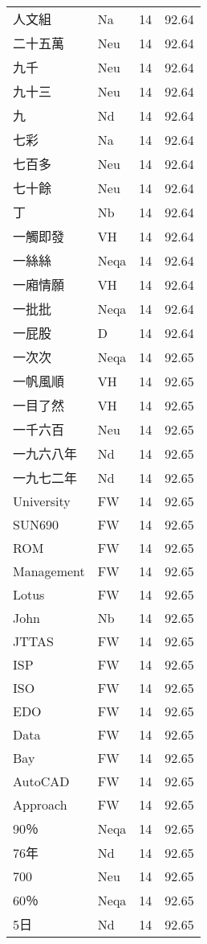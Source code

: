 \documentclass[twocolumn]{book}
\begin{document}
\begin{supertabular}{llrr}
人文組 & Na & 14 &  92.64\\
二十五萬 & Neu & 14 &  92.64\\
九千 & Neu & 14 &  92.64\\
九十三 & Neu & 14 &  92.64\\
九 & Nd & 14 &  92.64\\
七彩 & Na & 14 &  92.64\\
七百多 & Neu & 14 &  92.64\\
七十餘 & Neu & 14 &  92.64\\
丁 & Nb & 14 &  92.64\\
一觸即發 & VH & 14 &  92.64\\
一絲絲 & Neqa & 14 &  92.64\\
一廂情願 & VH & 14 &  92.64\\
一批批 & Neqa & 14 &  92.64\\
一屁股 & D & 14 &  92.64\\
一次次 & Neqa & 14 &  92.65\\
一帆風順 & VH & 14 &  92.65\\
一目了然 & VH & 14 &  92.65\\
一千六百 & Neu & 14 &  92.65\\
一九六八年 & Nd & 14 &  92.65\\
一九七二年 & Nd & 14 &  92.65\\
University & FW & 14 &  92.65\\
SUN690 & FW & 14 &  92.65\\
ROM & FW & 14 &  92.65\\
Management & FW & 14 &  92.65\\
Lotus & FW & 14 &  92.65\\
John & Nb & 14 &  92.65\\
JTTAS & FW & 14 &  92.65\\
ISP & FW & 14 &  92.65\\
ISO & FW & 14 &  92.65\\
EDO & FW & 14 &  92.65\\
Data & FW & 14 &  92.65\\
Bay & FW & 14 &  92.65\\
AutoCAD & FW & 14 &  92.65\\
Approach & FW & 14 &  92.65\\
90％ & Neqa & 14 &  92.65\\
76年 & Nd & 14 &  92.65\\
700 & Neu & 14 &  92.65\\
60％ & Neqa & 14 &  92.65\\
5日 & Nd & 14 &  92.65\\

\end{supertabular}
\end{document}
